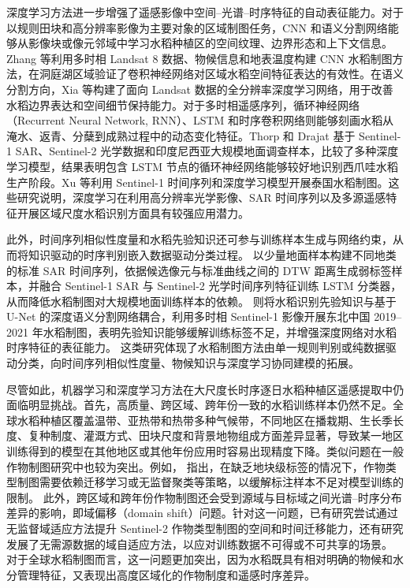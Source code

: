 深度学习方法进一步增强了遥感影像中空间--光谱--时序特征的自动表征能力。对于以规则田块和高分辨率影像为主要对象的区域制图任务，CNN 和语义分割网络能够从影像块或像元邻域中学习水稻种植区的空间纹理、边界形态和上下文信息。Zhang 等利用多时相 Landsat 8 数据、物候信息和地表温度构建 CNN 水稻制图方法，在洞庭湖区域验证了卷积神经网络对区域水稻空间特征表达的有效性\cite{Zhang2018CNN}。在语义分割方向，Xia 等构建了面向 Landsat 数据的全分辨率深度学习网络，用于改善水稻边界表达和空间细节保持能力\cite{Xia2022ISPRS}。对于多时相遥感序列，循环神经网络（Recurrent Neural Network, RNN）、LSTM 和时序卷积网络则能够刻画水稻从淹水、返青、分蘖到成熟过程中的动态变化特征。Thorp 和 Drajat 基于 Sentinel-1 SAR、Sentinel-2 光学数据和印度尼西亚大规模地面调查样本，比较了多种深度学习模型，结果表明包含 LSTM 节点的循环神经网络能够较好地识别西爪哇水稻生产阶段\cite{Thorp2021RSE}。Xu 等利用 Sentinel-1 时间序列和深度学习模型开展泰国水稻制图\cite{Xu2021ThailandDL}。这些研究说明，深度学习在利用高分辨率光学影像、SAR 时间序列以及多源遥感特征开展区域尺度水稻识别方面具有较强应用潜力。

此外，时间序列相似性度量和水稻先验知识还可参与训练样本生成与网络约束，从而将知识驱动的时序判别嵌入数据驱动分类过程。
\citet{Wang2020Agriculture} 以少量地面样本构建不同地类的标准 SAR 时间序列，依据候选像元与标准曲线之间的 DTW 距离生成弱标签样本，并融合 Sentinel-1 SAR 与 Sentinel-2 光学时间序列特征训练 LSTM 分类器，从而降低水稻制图对大规模地面训练样本的依赖。
\citet{Wei2022JAGDeep} 则将水稻识别先验知识与基于 U-Net 的深度语义分割网络耦合，利用多时相 Sentinel-1 影像开展东北中国 2019--2021 年水稻制图，表明先验知识能够缓解训练标签不足，并增强深度网络对水稻时序特征的表征能力。
这类研究体现了水稻制图方法由单一规则判别或纯数据驱动分类，向时间序列相似性度量、物候知识与深度学习协同建模的拓展。

尽管如此，机器学习和深度学习方法在大尺度长时序逐日水稻种植区遥感提取中仍面临明显挑战。首先，高质量、跨区域、跨年份一致的水稻训练样本仍然不足。全球水稻种植区覆盖温带、亚热带和热带多种气候带，不同地区在播栽期、生长季长度、复种制度、灌溉方式、田块尺度和背景地物组成方面差异显著，导致某一地区训练得到的模型在其他地区或其他年份应用时容易出现精度下降。类似问题在一般作物制图研究中也较为突出。例如，\cite{Wang2019NoLabels} 指出，在缺乏地块级标签的情况下，作物类型制图需要依赖迁移学习或无监督聚类等策略，以缓解标注样本不足对模型训练的限制。
此外，跨区域和跨年份作物制图还会受到源域与目标域之间光谱--时序分布差异的影响，即域偏移（domain shift）问题。针对这一问题，已有研究尝试通过无监督域适应方法提升 Sentinel-2 作物类型制图的空间和时间迁移能力\cite{Wang2023ISPRSDA}，还有研究发展了无需源数据的域自适应方法，以应对训练数据不可得或不可共享的场景\cite{Mohammadi2024SFUDA}。%
对于全球水稻制图而言，这一问题更加突出，因为水稻既具有相对明确的物候和水分管理特征，又表现出高度区域化的作物制度和遥感时序差异。


